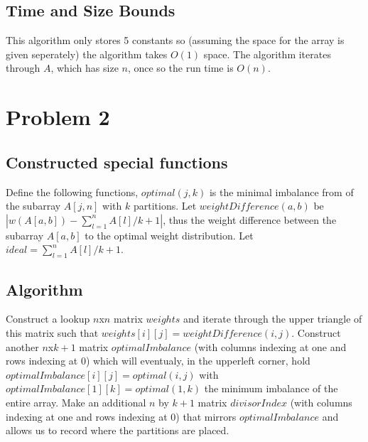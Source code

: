 \documentclass[11pt]{article}
\begin{document}
\subsection*{Time and Size Bounds}
This algorithm only stores 5 constants so (assuming the space for the array is given seperately) the algorithm takes $O(1)$ space. The algorithm iterates through $A$, which has size $n$, once so the run time is $O(n)$.

\section*{Problem 2}
\subsection*{Constructed special functions}
Define the following functions, $optimal(j,k)$ is the minimal imbalance from of the subarray $A[j,n]$ with $k$ partitions. Let $weightDifference(a,b)$ be $|w(A[a,b]) -\sum_{l=1}^{n} A[l] / k + 1|$, thus the weight difference between the subarray $A[a,b]$ to the optimal weight distribution. Let $ideal = \sum_{l=1}^{n} A[l] / k + 1$.

\subsection*{Algorithm}
Construct a lookup $n$x$n$ matrix $weights$ and iterate through the upper triangle of this matrix such that $weights[i][j] = weightDifference(i,j)$. Construct another $n$x$k+1$ matrix $optimalImbalance$ (with columns indexing at one and rows indexing at 0) which will eventualy, in the upperleft corner, hold $optimalImbalance[i][j] = optimal(i,j)$ with $optimalImbalance[1][k] = optimal(1,k)$ the minimum imbalance of the entire array. Make an additional $n$ by $k+1$ matrix $divisorIndex$ (with columns indexing at one and rows indexing at 0) that mirrors $optimalImbalance$ and allows us to record where the partitions are placed. \\
\end{document}

